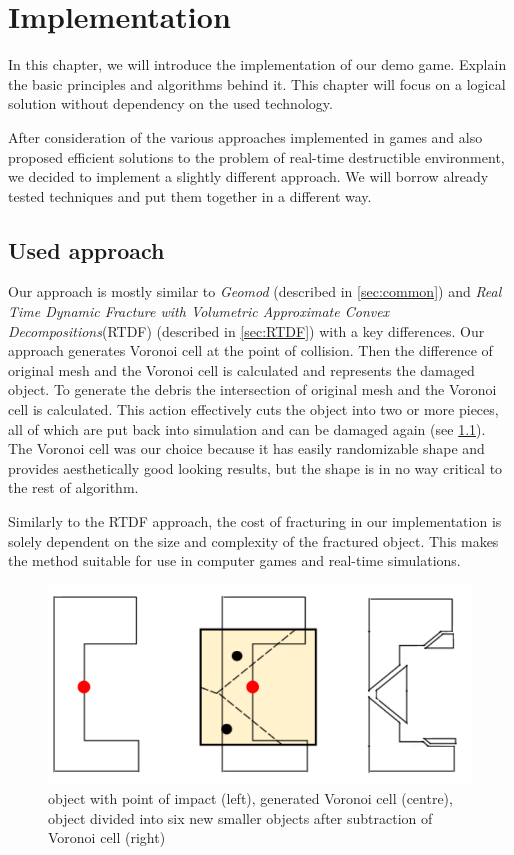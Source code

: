 \chapter{Implementation}
In this chapter, we will introduce the implementation of our demo game. Explain the basic principles and algorithms behind it. This chapter will focus on a logical solution without dependency on the used technology. 

After consideration of the various approaches implemented in games and also proposed efficient solutions to the problem of real-time destructible environment, we decided to implement a slightly different approach. We will borrow already tested techniques and put them together in a different way.

\section{Used approach}
Our approach is mostly similar to \emph{Geomod} (described in \cref{sec:common}) and \emph{Real Time Dynamic Fracture
with Volumetric Approximate Convex Decompositions}(RTDF) (described in \cref{sec:RTDF}) with a key differences. Our approach generates Voronoi cell at the point of collision. Then the difference of original mesh and the Voronoi cell is calculated and represents the damaged object. To generate the debris the intersection of original mesh and the Voronoi cell is calculated. This action effectively cuts the object into two or more pieces, all of which are put back into simulation and can be damaged again (see \cref{fig:subtraction}). The Voronoi cell was our choice because it has easily randomizable shape and provides aesthetically good looking results, but the shape is in no way critical to the rest of algorithm.

Similarly to the RTDF approach, the cost of fracturing in our implementation is solely dependent on the size and complexity of the fractured object.  This makes the method suitable for use in computer games and real-time simulations.

\begin{figure}
        \centering
        \includegraphics[width=\textwidth]{img/subtractionProcess}
        \caption{object with point of impact (left), generated Voronoi cell (centre), object divided into six new smaller objects after subtraction of Voronoi cell (right)}
        \label{fig:subtraction}
\end{figure}

